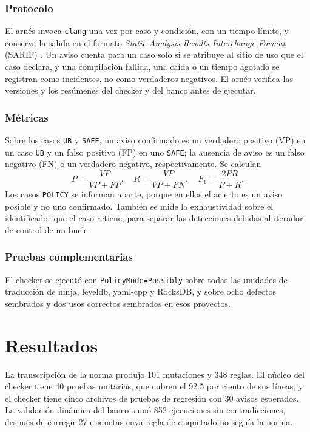 \documentclass[conference]{IEEEtran}
\newcommand{\code}[1]{\texttt{#1}}
\begin{document}
\subsubsection{Protocolo}
El arnés invoca \code{clang} una vez por caso y condición, con un tiempo límite, y conserva la salida en el formato \textit{Static Analysis Results Interchange Format} (SARIF) \cite{sarif}. Un aviso cuenta para un caso solo si se atribuye al sitio de uso que el caso declara, y una compilación fallida, una caída o un tiempo agotado se registran como incidentes, no como verdaderos negativos. El arnés verifica las versiones y los resúmenes del checker y del banco antes de ejecutar.

\subsubsection{Métricas}
Sobre los casos \code{UB} y \code{SAFE}, un aviso confirmado es un verdadero positivo (VP) en un caso \code{UB} y un falso positivo (FP) en uno \code{SAFE}; la ausencia de aviso es un falso negativo (FN) o un verdadero negativo, respectivamente. Se calculan
\begin{equation}
P=\frac{\mathit{VP}}{\mathit{VP}+\mathit{FP}},\quad R=\frac{\mathit{VP}}{\mathit{VP}+\mathit{FN}},\quad F_1=\frac{2PR}{P+R}.
\label{eq:metricas}
\end{equation}
Los casos \code{POLICY} se informan aparte, porque en ellos el acierto es un aviso posible y no uno confirmado. También se mide la exhaustividad sobre el identificador que el caso retiene, para separar las detecciones debidas al iterador de control de un bucle.

\subsubsection{Pruebas complementarias}
El checker se ejecutó con \code{PolicyMode=Possibly} sobre todas las unidades de traducción de ninja, leveldb, yaml-cpp y RocksDB, y sobre ocho defectos sembrados y dos usos correctos sembrados en esos proyectos.

\section{Resultados}

La transcripción de la norma produjo 101 mutaciones y 348 reglas. El núcleo del checker tiene 40 pruebas unitarias, que cubren el 92.5 por ciento de sus líneas, y el checker tiene cinco archivos de pruebas de regresión con 30 avisos esperados. La validación dinámica del banco sumó 852 ejecuciones sin contradicciones, después de corregir 27 etiquetas cuya regla de etiquetado no seguía la norma.
\end{document}
